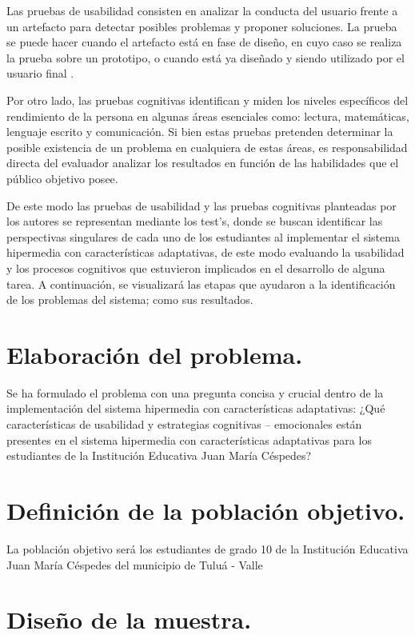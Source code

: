 
Las pruebas de usabilidad consisten en analizar la conducta del usuario frente a un artefacto para detectar posibles problemas y proponer soluciones. La prueba se puede hacer cuando el artefacto está en fase de diseño, en cuyo caso se realiza la prueba sobre un prototipo, o cuando está ya diseñado y siendo utilizado por el usuario final \cite{PUsabilidad}.

Por otro lado, las pruebas cognitivas identifican y miden los niveles específicos del rendimiento de la persona en algunas áreas esenciales como: lectura, matemáticas, lenguaje escrito y comunicación. Si bien estas pruebas pretenden determinar la posible existencia de un problema en cualquiera de estas áreas, es responsabilidad directa del evaluador analizar los resultados en función de las habilidades que el público objetivo posee. \cite{PCognitivas}

De este modo las pruebas de usabilidad y las pruebas cognitivas planteadas por los autores se representan mediante los test's, donde se buscan identificar las perspectivas singulares de cada uno de los estudiantes al implementar el sistema hipermedia con características adaptativas, de este modo evaluando la usabilidad y los procesos cognitivos que estuvieron implicados en el desarrollo de alguna tarea. A continuación, se visualizará las etapas que ayudaron a la identificación de los problemas del sistema; como sus resultados.

\section{Elaboración del problema.}

Se ha formulado el problema con una pregunta concisa y crucial dentro de la implementación del sistema hipermedia con características adaptativas: ¿Qué características de usabilidad y estrategias cognitivas – emocionales están presentes en el sistema hipermedia con características adaptativas para los estudiantes de la Institución Educativa Juan María Céspedes?

\section{Definición de la población objetivo.}

La población objetivo será los estudiantes de grado 10 de la Institución Educativa Juan María Céspedes del municipio de Tuluá - Valle

\section{Diseño de la muestra.}

